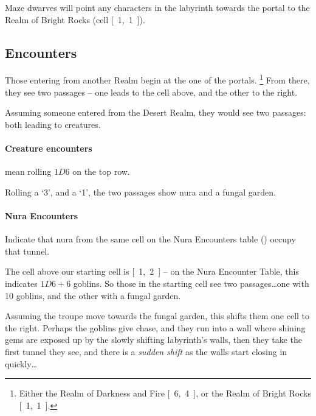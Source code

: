 \begin{multicols}{2}
Maze dwarves will point any characters in the labyrinth towards the portal to the Realm of Bright Rocks (cell \mbox{[ 1, 1 ]}).

\boxPair{
  \umberhulk
}{
  \archmage
}

\subsection{Encounters}
\label{labyrinth}

Those entering from another Realm begin at the one of the portals.
\footnote{Either the Realm of Darkness and Fire \mbox{[ 6, 4 ]}, or the Realm of Bright Rocks \mbox{[ 1, 1 ]}.}
From there, they see two passages -- one leads to the cell above, and the other to the right.

\begin{exampletext}
  Assuming someone entered from the Desert Realm, they would see two passages: both leading to creatures.
\end{exampletext}

\paragraph{Creature encounters}
mean rolling $1D6$ on the top row.

\begin{exampletext}
  Rolling a `3', and a `1', the two passages show nura and a fungal garden.
\end{exampletext}

\jelly

\paragraph{Nura Encounters}
Indicate that nura from the same cell on the Nura Encounters table () occupy that tunnel.

\begin{exampletext}
  The cell above our starting cell is \mbox{[ 1, 2 ]} -- on the Nura Encounter Table, this indicates $1D6+6$ goblins.
  So those in the starting cell see two passages\ldots one with 10 goblins, and the other with a fungal garden.

  Assuming the troupe move towards the fungal garden, this shifts them one cell to the right.
  Perhaps the goblins give chase, and they run into a wall where shining gems are exposed up by the slowly shifting labyrinth's walls, then they take the first tunnel they see, and there is a \textit{sudden shift} as the walls start closing in quickly\ldots
\end{exampletext}


\end{multicols}
